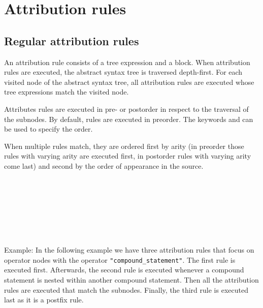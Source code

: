\chapter{Attribution rules}\label{attr}

\section{Regular attribution rules}\label{reg-attr}
An attribution rule consists of a tree expression and a block. When
attribution rules are executed, the abstract syntax tree is traversed
depth-first. For each visited node of the abstract syntax tree, all
attribution rules are executed whose tree expressions match the visited
node.

Attributes rules are executed in pre- or postorder in respect to the
traversal of the subnodes. By default, rules are executed in preorder.
The keywords  and  can be used to specify the
order.

When multiple rules match, they are ordered first by arity (in preorder
those rules with varying arity are executed first, in postorder rules
with varying arity come last) and second by the order of appearance in
the source.

\begin{grammar}
      \produces {} 
	 \lextoken{\{} 
	 \lextoken{\}} \\
      \produces {} \\
      \produces {}  \\
      \produces {}
	 \lextoken{->}  \\
      \produces {}
	 \lextoken{->}   \\
      \produces {}
	 \lextoken{->}   \\
\end{grammar}

\noindent
Example: In the following example we have three attribution rules
that focus on operator nodes with the operator
\lstinline!"compound_statement"!. The first rule is executed
first. Afterwards, the second rule is executed whenever a
compound statement is nested within another compound statement.
Then all the attribution rules are executed that match the subnodes.
Finally, the third rule is executed last as it is a postfix rule.

